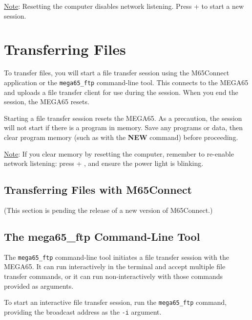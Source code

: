 \underline{Note}: Resetting the computer disables network listening. Press  + \megakey{\pounds} to start a new session.

\section{Transferring Files}

To transfer files, you will start a file transfer session using the M65Connect application or the {\tt mega65\_ftp} command-line tool. This connects to the MEGA65 and uploads a file transfer client for use during the session. When you end the session, the MEGA65 resets.

Starting a file transfer session resets the MEGA65. As a precaution, the session will not start if there is a program in memory. Save any programs or data, then clear program memory (such as with the {\bf NEW} command) before proceeding.

\underline{Note}: If you clear memory by resetting the computer, remember to re-enable network listening: press  + \megakey{\pounds}, and ensure the power light is blinking.

\subsection{Transferring Files with M65Connect}

(This section is pending the release of a new version of M65Connect.)


\subsection{The mega65\_ftp Command-Line Tool}

The {\tt mega65\_ftp} command-line tool initiates a file transfer session with the MEGA65. It can run interactively in the terminal and accept multiple file transfer commands, or it can run non-interactively with those commands provided as arguments.


To start an interactive file transfer session, run the {\tt mega65\_ftp} command, providing the broadcast address as the {\tt -i} argument.

